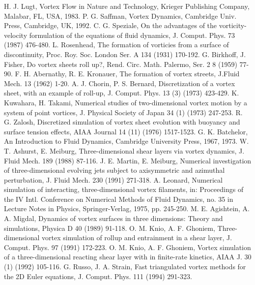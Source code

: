 \documentclass[letterpaper,12pt]{report}
\begin{document}
\begin{thebibliography}{8}
H. J. Lugt, Vortex Flow in Nature and Technology, Krieger Publishing Company, Malabar, FL, USA, 1983.
P. G. Saffman, Vortex Dynamics, Cambridge Univ. Press, Cambridge, UK, 1992.
C. G. Speziale, On the advantages of the vorticity-velocity formulation of the equations of fluid dynamics, J. Comput. Phys. 73 (1987) 476-480.
L. Rosenhead, The formation of vorticies from a surface of discontinuity, Proc. Roy. Soc. London Ser. A 134 (1931) 170-192.
G. Birkhoff, J. Fisher, Do vortex sheets roll up?, Rend. Circ. Math. Palermo, Ser. 2 8 (1959) 77-90.
F. H. Abernathy, R. E. Kronauer, The formation of vortex streets, J.Fluid Mech. 13 (1962) 1-20.
A. J. Chorin, P. S. Bernard, Discretization of a vortex sheet, with an example of roll-up, J. Comput. Phys. 13 (3) (1973) 423-429.
K. Kuwahara, H. Takami, Numerical studies of two-dimensional vortex motion by a system of point vortices, J. Physical Society of Japan 34 (1) (1973) 247-253.
R. G. Zalosh, Discretized simulation of vortex sheet evolution with buoyancy and surface tension effects, AIAA Journal 14 (11) (1976) 1517-1523.
G. K. Batchelor, An Introduction to Fluid Dynamics, Cambridge University Press, 1967, 1973.
W. T. Ashurst, E. Meiburg, Three-dimensional shear layers via vortex dynamics, J. Fluid Mech. 189 (1988) 87-116.
J. E. Martin, E. Meiburg, Numerical investigation of three-dimensional evolving jets subject to axisymmetric and azimuthal perturbation, J. Fluid Mech. 230 (1991) 271-318.
A. Leonard, Numerical simulation of interacting, three-dimensional vortex filaments, in: Proceedings of the IV Intl. Conference on Numerical Methods of Fluid Dynamics, no. 35 in Lecture Notes in Physics, Springer-Verlag, 1975, pp. 245-250.
M. E. Agishtein, A. A. Migdal, Dynamics of vortex surfaces in three dimensions: Theory and simulations, Physica D 40 (1989) 91-118.
O. M. Knio, A. F. Ghoniem, Three-dimensional vortex simulation of rollup and entrainment in a shear layer, J. Comput. Phys. 97 (1991) 172-223.
O. M. Knio, A. F. Ghoniem, Vortex simulation of a three-dimensional reacting shear layer with in finite-rate kinetics, AIAA J. 30 (1) (1992) 105-116.
G. Russo, J. A. Strain, Fast triangulated vortex methods for the 2D Euler equations, J. Comput. Phys. 111 (1994) 291-323.

\end{thebibliography}
\end{document}

